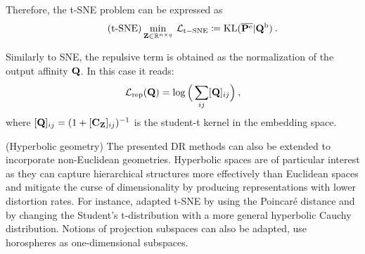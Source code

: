 Therefore, the t-SNE problem can be expressed as
\begin{align}\label{eq:t-SNE_pb}\tag{t-SNE}
    \min_{\mathbf{Z} \in \mathbb{R}^{n \times q}} \: \mathcal{L}_{\mathrm{t-SNE}} \coloneqq \operatorname{KL}(\overline{{\mathbf{P}}^{\mathrm{e}}} | {\mathbf{Q}}^{\mathrm{b}}) \:.
\end{align}

Similarly to SNE, the repulsive term is obtained as the normalization of the output affinity ${\mathbf{Q}}$. In this case it reads:
\begin{align}
    \mathcal{L}_{\mathrm{rep}}({\mathbf{Q}}) = \log \Big(\sum_{ij} [{\mathbf{Q}}]_{ij} \Big) \:,
\end{align}
where $[{\mathbf{Q}}]_{ij} = (1 + [\mathbf{C}_{\mathbf{Z}}]_{ij})^{-1}$ is the student-t kernel in the embedding space.

\begin{remark}{(Hyperbolic geometry)} 
The presented DR methods can also be extended to incorporate non-Euclidean geometries. Hyperbolic spaces \citep{Chami21, Fan_2022_CVPR, Guo22, Lin23} are of particular interest as they can capture hierarchical structures more effectively than Euclidean spaces and mitigate the curse of dimensionality by producing representations with lower distortion rates. 
For instance, \citet{Guo22} adapted t-SNE by using the Poincaré distance and by changing the Student's t-distribution with a more general hyperbolic Cauchy distribution.  Notions of projection subspaces can also be adapted, \eg \citet{Chami21} use horospheres as one-dimensional subspaces. 
\end{remark}

